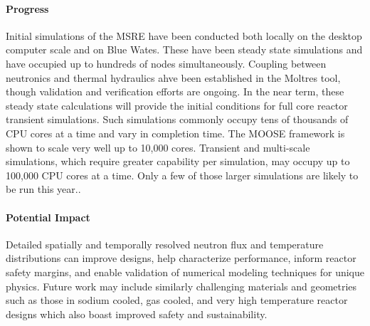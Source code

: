 \documentclass[11pt]{article}
\begin{document}
\paragraph{Progress}

Initial simulations of the MSRE have been conducted both locally on the desktop 
computer scale and on Blue Wates. These have been steady state simulations and 
have occupied up to hundreds of nodes simultaneously. Coupling between 
neutronics and thermal hydraulics ahve been established in the Moltres tool, 
though validation and verification efforts are ongoing. In the near term, these 
steady state calculations will provide the initial conditions for full core 
reactor transient simulations. Such simulations commonly occupy tens of 
thousands of CPU cores at a time and vary in completion time. The MOOSE 
framework is shown to scale very well up to 10,000 cores. Transient and 
multi-scale simulations, which require greater capability per simulation, may 
occupy up to 100,000 CPU cores at a time. Only a few of those larger 
simulations are likely to be run this year..

\paragraph{Potential Impact}
Detailed spatially and temporally resolved neutron flux and
temperature distributions can improve designs, help characterize
performance, inform reactor safety margins, and enable validation of numerical
modeling techniques for unique physics.
Future work may include similarly challenging materials and geometries such as
those in sodium cooled, gas cooled, and very high temperature reactor designs
which also boast improved safety and sustainability.
\end{document}
